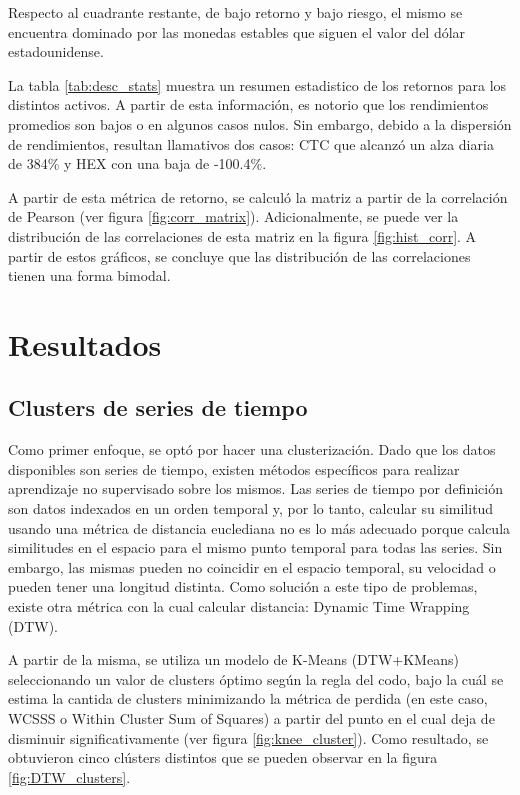 \documentclass[runningheads,legalpaper,10pt]{etc/llncs}
\let\stdsection\section
\renewcommand\section{\newpage\stdsection}
\begin{document}
Respecto al cuadrante restante, de bajo retorno y bajo riesgo, el mismo se encuentra dominado por las monedas estables que siguen el valor del dólar estadounidense.

La tabla \ref{tab:desc_stats} muestra un resumen estadistico de los retornos para los distintos activos. A partir de esta información, es notorio que los rendimientos promedios son bajos o en algunos casos nulos. Sin embargo, debido a la dispersión de rendimientos, resultan llamativos dos casos: CTC que alcanzó un alza diaria de 384\% y HEX con una baja de -100.4\%.

A partir de esta métrica de retorno, se calculó la matriz a partir de la correlación de Pearson (ver figura \ref{fig:corr_matrix}). Adicionalmente, se puede ver la distribución de las correlaciones de esta matriz en la figura \ref{fig:hist_corr}. A partir de estos gráficos, se concluye que las distribución de las correlaciones tienen una forma bimodal.

\section{Resultados}


\subsection{Clusters de series de tiempo}

Como primer enfoque, se optó por hacer una clusterización. Dado que los datos disponibles son series de tiempo, existen métodos específicos para realizar aprendizaje no supervisado sobre los mismos. Las series de tiempo por definición son datos indexados en un orden temporal y, por lo tanto, calcular su similitud usando una métrica de distancia euclediana no es lo más adecuado porque calcula similitudes en el espacio para el mismo punto temporal para todas las series. Sin embargo, las mismas pueden no coincidir en el espacio temporal, su velocidad o pueden tener una longitud distinta. Como solución a este tipo de problemas, existe otra métrica con la cual calcular distancia: Dynamic Time Wrapping (DTW). 

A partir de la misma, se utiliza un modelo de K-Means (DTW+KMeans) seleccionando un valor de clusters óptimo según la regla del codo, bajo la cuál se estima la cantida de clusters minimizando la métrica de perdida (en este caso, WCSSS o Within Cluster Sum of Squares) a partir del punto en el cual deja de disminuir significativamente (ver figura \ref{fig:knee_cluster}). 
Como resultado, se obtuvieron cinco clústers distintos que se pueden observar en la figura \ref{fig:DTW_clusters}. 
\end{document}
